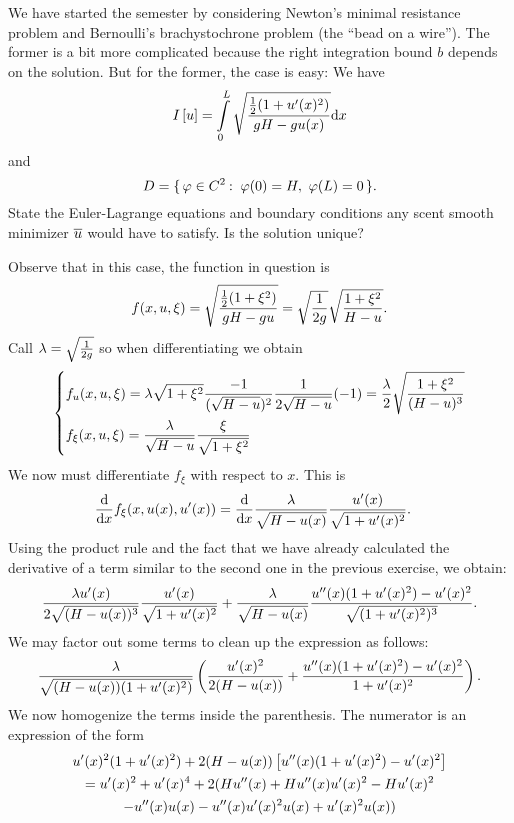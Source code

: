 \documentclass[12pt]{memoir}
\begin{document}
\begin{Ej}
    We have started the semester by considering Newton's
    minimal resistance problem and Bernoulli's brachystochrone problem (the ``bead on a wire''). The former is
    a bit more complicated because the right integration bound $ b$ depends on the solution. But for the former,
    the case is easy: We have
    $$I\bonj{u}=\int\limits_0^L\sqrt{\frac{\half(1+u'(x)^2)}{gH-gu(x)}}\dd x$$
    and
    $$D=\set{\vf\in C^2\:\ \vf(0)=H,\ \vf(L)=0}.$$
    State the Euler-Lagrange equations and boundary conditions any scent smooth minimizer $\overline u$ would
have to satisfy. Is the solution unique?
\end{Ej}

\begin{ptcbr}
Observe that in this case, the function in question is 
$$f(x,u,\xi)=\sqrt{\frac{\half(1+\xi^2)}{gH-gu}}=\sqrt{\frac{1}{2g}}\sqrt{\frac{1+\xi^2}{H-u}}.$$
Call $\lambda=\sqrt{\frac{1}{2g}}$ so when differentiating we obtain 
$$\left\lbrace
\begin{aligned}
    &f_u(x,u,\xi)=\lambda\sqrt{1+\xi^2}\frac{-1}{(\sqrt{H-u})^2}\frac{1}{2\sqrt{H-u}}(-1)=\frac{\lambda}{2}\sqrt{\frac{1+\xi^2}{(H-u)^3}}\\
    &f_\xi(x,u,\xi)=\frac{\lambda}{\sqrt{H-u}}\frac{\xi}{\sqrt{1+\xi^2}}
\end{aligned}
\right.
$$
We now must differentiate $f_\xi$ with respect to $x$. This is 
\begin{align*}
    \dv{x}f_{\xi}(x,u(x),u'(x))&=\dv{x}\frac{\lambda}{\sqrt{H-u(x)}}\frac{u'(x)}{\sqrt{1+u'(x)^2}}.
\end{align*}
Using the product rule and the fact that we have already calculated the derivative of a term similar to the second one in the previous exercise, we obtain:
$$\frac{\lambda u'(x)}{2\sqrt{(H-u(x))^3}}\frac{u'(x)}{\sqrt{1+u'(x)^2}}+\frac{\lambda}{\sqrt{H-u(x)}}\frac{u''(x)(1+u'(x)^2)-u'(x)^2}{\sqrt{(1+u'(x)^2)^3}}.$$
We may factor out some terms to clean up the expression as follows:
$$\frac{\lambda}{\sqrt{(H-u(x))(1+u'(x)^2)}}\left(\frac{u'(x)^2}{2(H-u(x))}+\frac{u''(x)(1+u'(x)^2)-u'(x)^2}{1+u'(x)^2}\right).$$
We now homogenize the terms inside the parenthesis. The numerator is an expression of the form 
\begin{gather*}
u'(x)^2(1+u'(x)^2)+2(H-u(x))\left\lbrack u''(x)(1+u'(x)^2)-u'(x)^2\right\rbrack\\
=u'(x)^2+u'(x)^4+2(Hu''(x)+Hu''(x)u'(x)^2-Hu'(x)^2\\
-u''(x)u(x)-u''(x)u'(x)^2u(x)+u'(x)^2u(x))
\end{gather*}
\end{ptcbr}
\end{document}
